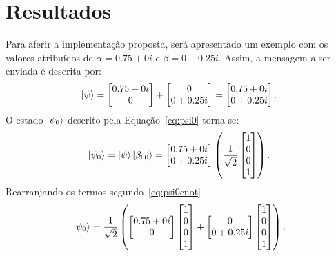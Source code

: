 \chapter{Resultados}

Para aferir a implementação proposta, será apresentado um exemplo com os valores atribuídos de $\alpha = {0.75+0i}$ e $\beta = {0+0.25i}$. Assim, a mensagem a ser enviada é descrita por:
\begin{equation}
  \ket{\psi} =  \begin{bmatrix} {0.75+0i} \\ 0 \end{bmatrix} +
  \begin{bmatrix} 0 \\ {0+0.25i} \end{bmatrix} =
  \begin{bmatrix} {0.75+0i} \\ {0+0.25i} \end{bmatrix}.
\end{equation}
O estado $\ket{\psi_0}$ descrito pela Equação~\eqref{eq:psi0} torna-se:
\begin{equation}
  \ket{\psi_0} = \ket{\psi}\ket{\beta_{00}} =
  \begin{bmatrix} {0.75+0i} \\ {0+0.25i} \end{bmatrix}
  \left(\frac{1}{\sqrt{2}} \begin{bmatrix} 1 \\ 0 \\ 0 \\ 1 \end{bmatrix}\right).
\end{equation}
Rearranjando os termos segundo~\eqref{eq:psi0cnot}
\begin{equation}
  \ket{\psi_0} = \frac{1}{\sqrt{2}}\left(
      \begin{bmatrix} {0.75+0i} \\ 0 \end{bmatrix}
      \begin{bmatrix} 1 \\ 0 \\ 0 \\ 1 \end{bmatrix} +
      \begin{bmatrix} 0 \\ {0+0.25i} \end{bmatrix}
      \begin{bmatrix} 1 \\ 0 \\ 0 \\ 1 \end{bmatrix}\right).
  \end{equation}

